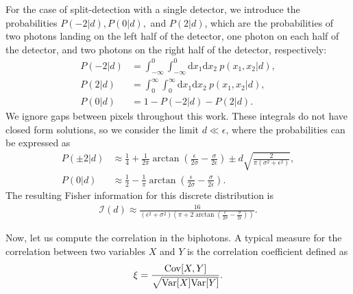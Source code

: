 For the case of split-detection with a single detector, we introduce the probabilities $P(-2|d), P(0|d),$ and $P(2|d)$, which are the probabilities of two photons landing on the left half of the detector, one photon on each half of the detector, and two photons on the right half of the detector, respectively: 
\begin{align}\label{eq:biphotonprobs}
	\nonumber	P(-2|d) &= \int_{-\infty}^{0}\int_{-\infty}^{0}\text{d}x_1\text{d}x_2~p({x_1,x_2}|d), \\
	\nonumber	P(2|d) &= \int_{0}^{\infty}\int_{0}^{\infty}\text{d}x_1\text{d}x_2~p({x_1,x_2}|d),\\
	P(0|d) &= 1 - P(-2|d) - P(2|d).
\end{align} 
We ignore gaps between pixels throughout this work.
These integrals do not have closed form solutions, so we consider the limit $d \ll \epsilon$, where the probabilities can be expressed as   
\begin{align}
	\nonumber	P(\pm2|d) &\approx\frac{1}{4}+\frac{1}{2 \pi }\arctan\left(\frac{\epsilon }{2 \sigma }-\frac{\sigma }{2 \epsilon }\right)\pm d\sqrt{\frac{2}{\pi(\sigma ^2+\epsilon ^2)}}, \\
	P(0|d) &\approx\frac{1}{2}-\frac{1}{\pi}\arctan\left(\frac{\epsilon }{2 \sigma }-\frac{\sigma }{2 \epsilon }\right).
    \label{eq:splitProbs}
\end{align}
The resulting Fisher information for this discrete distribution is 
\begin{align}\label{eq:generalfisher}
	\mathcal{I}(d)\approx\frac{16}{\left(\epsilon ^2+\sigma ^2\right) \left(\pi+2 \arctan\left(\frac{\epsilon }{2 \sigma }-\frac{\sigma }{2 \epsilon }\right) \right)}.
\end{align}

Now, let us compute the correlation in the biphotons. A typical measure for the correlation between two variables $X$ and $Y$ is the correlation coefficient defined as
\begin{align}
\xi=\frac{{\rm {Cov}}[X,Y]}{\sqrt{{\rm {Var}}[X]{\rm {Var}}[Y]}}.
\end{align}

